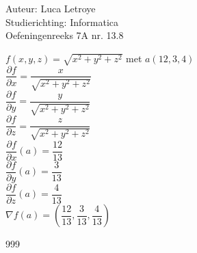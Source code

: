 \documentclass[a4paper]{article}
\begin{document}
  
\noindent \large Auteur: Luca Letroye \\
\noindent \large Studierichting: Informatica\\
\noindent \large Oefeningenreeks 7A nr. 13.8\\

\medskip
\normalsize

$f(x,y,z) = \sqrt{x^2+y^2+z^2}$ met $a(12,3,4)$\\

$\dfrac{\partial f}{\partial x} = \dfrac{x}{\sqrt{x^2+y^2+z^2}}$\\

$\dfrac{\partial f}{\partial y} = \dfrac{y}{\sqrt{x^2+y^2+z^2}}$\\

$\dfrac{\partial f}{\partial z} = \dfrac{z}{\sqrt{x^2+y^2+z^2}}$\\

$\dfrac{\partial f}{\partial x}(a) = \dfrac{12}{13}$\\

$\dfrac{\partial f}{\partial y}(a) = \dfrac{3}{13}$\\

$\dfrac{\partial f}{\partial z}(a) = \dfrac{4}{13}$\\

$\nabla f(a) = \left( \dfrac{12}{13}, \dfrac{3}{13}, \dfrac{4}{13} \right)$




\begin{thebibliography}{999}
\end{thebibliography}
\end{document}
